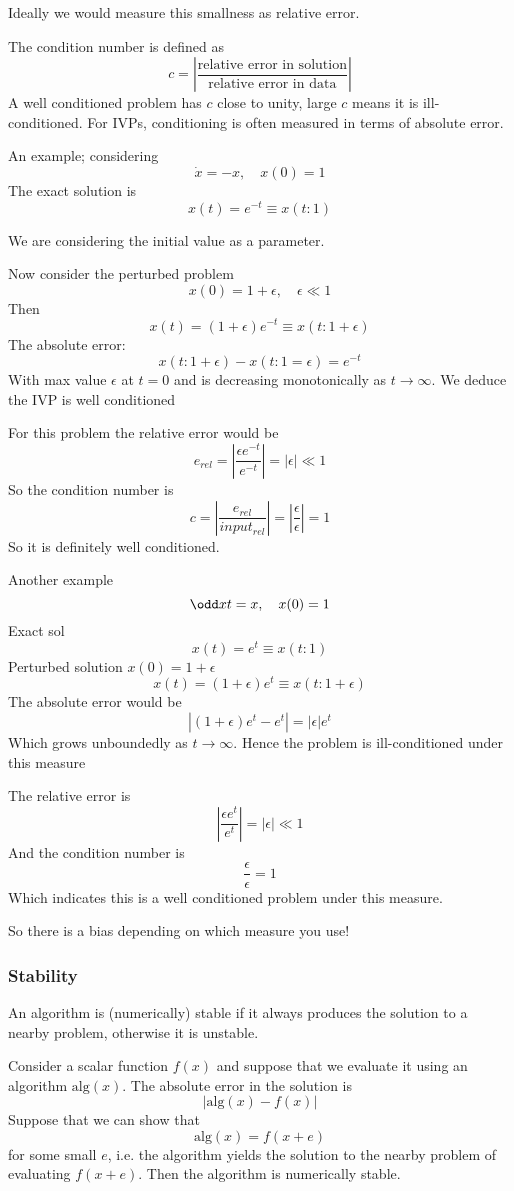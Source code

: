 \documentclass{X:/Documents/Coding/Latex/myassignment}
\begin{document}
Ideally we would measure this smallness as relative error. 


The condition number is defined as 
\[c = \left|\frac{\text{relative error in solution}}{\text{relative error in data}}\right|\]
A well conditioned problem has $c$ close to unity, large $c$ means it is ill-conditioned. For IVPs, conditioning is often measured in terms of absolute error.


An example; considering 
\[\dot x = -x, \quad x(0) = 1\]
The exact solution is 
\[x(t) = e^{-t} \equiv x(t:1)\]

We are considering the initial value as a parameter.

Now consider the perturbed problem
\[x(0) = 1 + \epsilon, \quad \epsilon \ll 1\]
Then 
\[x(t) = (1+\epsilon) e^{-t} \equiv x(t:1+\epsilon)\]
The absolute error:
\[x(t:1+\epsilon) - x(t:1 = \epsilon) = e^{-t}\]
With max value $\epsilon$ at $t=0$ and is decreasing monotonically as $t\to\infty$.
We deduce the IVP is well conditioned

For this problem the relative error would be
\[e_{rel} = \left|\frac{\epsilon e^{-t}}{e^{-t}}\right| = |\epsilon| \ll 1\]
So the condition number is
\[c = \left|\frac{e_{rel}}{input_{rel}}\right| = \left|\frac{\epsilon}{\epsilon}\right| = 1 \]
So it is definitely well conditioned.

Another example
\[\odd xt = x, \quad x(0)=1\]
Exact sol
\[x(t) = e^t \equiv x(t:1)\]
Perturbed solution $x(0) = 1+\epsilon$
\[x(t) = (1+\epsilon)e^{t} \equiv x(t:1+\epsilon)\]
The absolute error would be
\[\left|(1+\epsilon) e^t - e^t\right| = |\epsilon| e^t\]
Which grows unboundedly as $t\to\infty$. Hence the problem is ill-conditioned under this measure

The relative error is
\[\left|\frac{\epsilon e^t}{e^t}\right| = |\epsilon| \ll 1\]
And the condition number is
\[\frac{\epsilon}{\epsilon} = 1\]
Which indicates this is a well conditioned problem under this measure.

So there is a bias depending on which measure you use! 

\subsubsection{Stability}
An algorithm is (numerically) stable if it always produces the solution to a nearby problem, otherwise it is unstable.

Consider a scalar function $f(x)$ and suppose that we evaluate it using an algorithm $\mathrm{alg}(x)$. The absolute error in the solution is 
\[|\mathrm{alg}(x) - f(x)|\]
Suppose that we can show that 
\[\mathrm{alg}(x) = f(x+e)\]
for some small $e$, i.e. the algorithm yields the solution to the nearby problem of evaluating $f(x+e)$. Then the algorithm is numerically stable.
\end{document}
